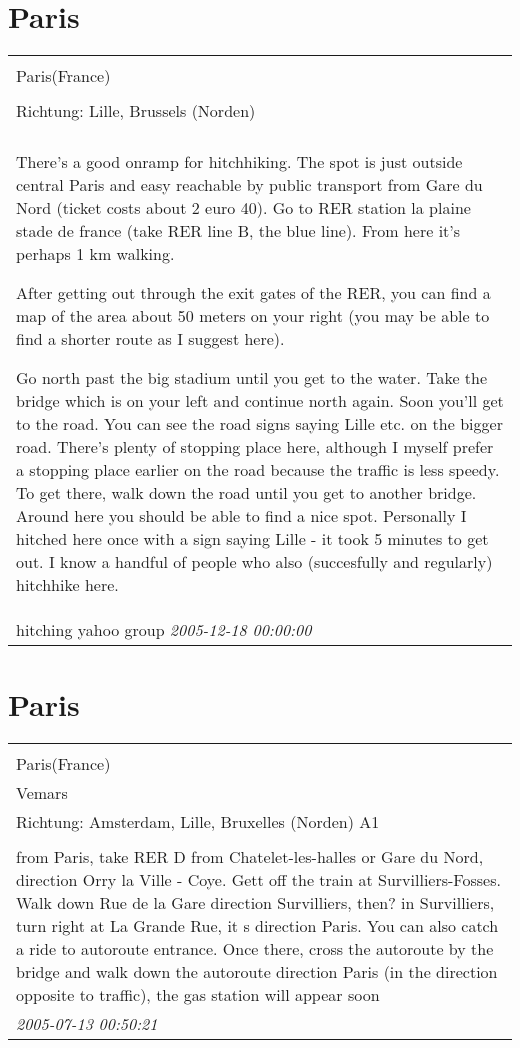 \documentclass[a4paper,12pt]{article}
\begin{document}
\section{Paris}
\begin{tabular}{|p{13cm}|}
\hline\\
Paris(France)\\
\\
Richtung: Lille, Brussels (Norden) \\
\hline\\
There's a good onramp for hitchhiking. The spot is just outside central Paris and easy reachable by public transport from Gare du Nord (ticket costs about 2 euro 40). Go to RER station la plaine stade de france (take RER line B, the blue line). From here it's perhaps 1 km
walking.

After getting out through the exit gates of the RER, you can find a map of the area about 50 meters on your right (you may be able to find a shorter route as I suggest here).

Go north past the big stadium until you get to the water. Take the bridge which is on your left and continue north again. Soon you'll get to the road. You can see the road signs saying Lille etc. on the bigger road. There's plenty of stopping place here, although I myself prefer a stopping place earlier on the road because the traffic is less speedy. To get there, walk down the road until you get to another bridge. Around here you should be able to find a nice spot. Personally I hitched here once with a sign saying Lille - it took 5 minutes to get out. I know a handful of people who also (succesfully and regularly) hitchhike here. \\
hitching yahoo group \textit{ 2005-12-18 00:00:00 }\\\hline
\end{tabular}


\section{Paris}
\begin{tabular}{|p{13cm}|}
\hline\\
Paris(France)\\
Vemars\\
Richtung: Amsterdam, Lille, Bruxelles (Norden) A1 \\
\hline\\
from Paris, take RER D from Chatelet-les-halles or Gare du Nord, direction Orry la Ville - Coye. Gett off the train at Survilliers-Fosses. Walk down Rue de la Gare direction Survilliers, then? in Survilliers, turn right at La Grande Rue, it s direction Paris. You can also catch a ride to autoroute entrance. Once there, cross the autoroute by the bridge and walk down the autoroute direction Paris (in the direction opposite to traffic), the gas station will appear soon \\
\textit{ 2005-07-13 00:50:21 }\\\hline
\end{tabular}
\end{document}
